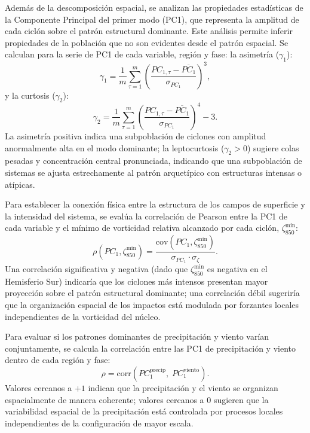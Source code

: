 Además de la descomposición espacial, se analizan las propiedades estadísticas de la Componente Principal del primer modo (PC1), que representa la amplitud de cada ciclón sobre el patrón estructural dominante. Este análisis permite inferir propiedades de la población que no son evidentes desde el patrón espacial. Se calculan para la serie de PC1 de cada variable, región y fase: la asimetría ($\gamma_1$):
\begin{equation}
    \gamma_1 = \frac{1}{m} \sum_{\tau=1}^{m} \left(\frac{PC_{1,\tau} - \overline{PC_1}}{\sigma_{PC_1}}\right)^3,
\end{equation}
y la curtosis ($\gamma_2$):
\begin{equation}
    \gamma_2 = \frac{1}{m} \sum_{\tau=1}^{m} \left(\frac{PC_{1,\tau} - \overline{PC_1}}{\sigma_{PC_1}}\right)^4 - 3.
\end{equation}
La asimetría positiva indica una subpoblación de ciclones con amplitud anormalmente alta en el modo dominante; la leptocurtosis ($\gamma_2 > 0$) sugiere colas pesadas y concentración central pronunciada, indicando que una subpoblación de sistemas se ajusta estrechamente al patrón arquetípico con estructuras intensas o atípicas.

Para establecer la conexión física entre la estructura de los campos de superficie y la intensidad del sistema, se evalúa la correlación de Pearson entre la PC1 de cada variable y el mínimo de vorticidad relativa alcanzado por cada ciclón, $\zeta_{850}^{\min}$:
\begin{equation}
    \rho\!\left(PC_1, \zeta_{850}^{\min}\right) = \frac{\text{cov}\!\left(PC_1, \zeta_{850}^{\min}\right)}{\sigma_{PC_1} \cdot \sigma_{\zeta}}.
\end{equation}
Una correlación significativa y negativa (dado que $\zeta_{850}^{\min}$ es negativa en el Hemisferio Sur) indicaría que los ciclones más intensos presentan mayor proyección sobre el patrón estructural dominante; una correlación débil sugeriría que la organización espacial de los impactos está modulada por forzantes locales independientes de la vorticidad del núcleo.

Para evaluar si los patrones dominantes de precipitación y viento varían conjuntamente, se calcula la correlación entre las PC1 de precipitación y viento dentro de cada región y fase:
\begin{equation}
    \rho = \text{corr}\!\left(PC_1^{\text{precip}},\; PC_1^{\text{viento}}\right).
\end{equation}
Valores cercanos a $+1$ indican que la precipitación y el viento se organizan espacialmente de manera coherente; valores cercanos a $0$ sugieren que la variabilidad espacial de la precipitación está controlada por procesos locales independientes de la configuración de mayor escala.

